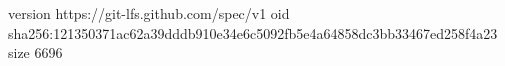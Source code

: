 version https://git-lfs.github.com/spec/v1
oid sha256:121350371ac62a39dddb910e34e6c5092fb5e4a64858dc3bb33467ed258f4a23
size 6696
